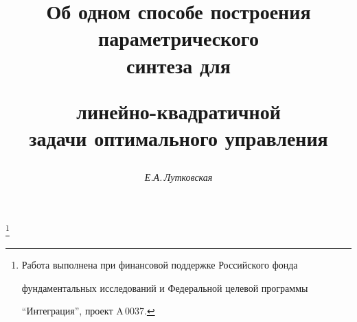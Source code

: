 




% 


\newcommand{\tts}[1]{}









\setcounter{page}{71}















\author{\it Е.А.\,Лутковская}




\title{Об одном способе построения параметрического\\ синтеза для


линейно-квадратичной\\ задачи оптимального управления}


\thanks{Работа выполнена при финансовой поддержке Российского фонда


фундаментальных исследований и Федеральной целевой программы


``Интеграция'', проект A\,0037.}


\date{}







\pagestyle{plain} %





